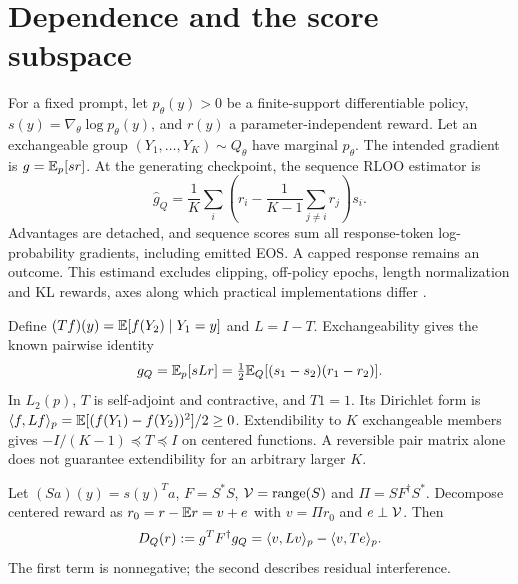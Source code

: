 \section{Dependence and the score subspace}
For a fixed prompt, let $p_\theta(y)>0$ be a finite-support differentiable policy,
$s(y)=\nabla_\theta\log p_\theta(y)$, and $r(y)$ a parameter-independent reward.
Let an exchangeable group $(Y_1,\ldots,Y_K)\sim Q_\theta$ have marginal $p_\theta$.
The intended gradient is $g=\mathbb{E}_p[sr]$. At the generating checkpoint, the sequence
RLOO estimator is
\begin{equation}
\widehat g_Q=\frac1K\sum_i\left(r_i-\frac1{K-1}\sum_{j\ne i}r_j\right)s_i.
\label{eq:rloo}
\end{equation}
Advantages are detached, and sequence scores sum all response-token log-probability
gradients, including emitted EOS. A capped response remains an outcome. This
estimand excludes clipping, off-policy epochs, length normalization and KL rewards,
axes along which practical implementations differ
\citep{grpo2026ustatistic,trl}.

Define $(Tf)(y)=\mathbb{E}[f(Y_2)\mid Y_1=y]$ and $L=I-T$. Exchangeability gives the known
pairwise identity
\begin{equation}
g_Q=\mathbb{E}_p[sLr]=\tfrac12\mathbb{E}_Q[(s_1-s_2)(r_1-r_2)].\label{eq:operator}
\end{equation}
In $L_2(p)$, $T$ is self-adjoint and contractive, and $T1=1$.
Its Dirichlet form is $\langle f,Lf\rangle_p=\mathbb{E}[(f(Y_1)-f(Y_2))^2]/2\ge0$.
Extendibility to $K$ exchangeable members gives
$-I/(K-1)\preceq T\preceq I$ on centered functions. A reversible pair matrix
alone does not guarantee extendibility for an arbitrary larger $K$.

Let $(Sa)(y)=s(y)^Ta$, $F=S^*S$, $\mathcal{V}=\operatorname{range}(S)$ and
$\Pi=SF^\dagger S^*$. Decompose centered reward as
$r_0=r-\mathbb{E} r=v+e$ with $v=\Pi r_0$ and $e\perp\mathcal{V}$. Then
\begin{equation}
D_Q(r):=g^TF^\dagger g_Q
=\langle v,Lv\rangle_p-\langle v,Te\rangle_p.\label{eq:decomposition}
\end{equation}
The first term is nonnegative; the second describes residual interference.


